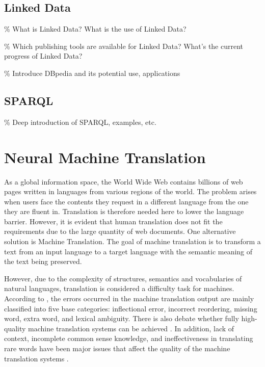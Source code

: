 \subsection{Linked Data} \label{subsection:linked data}
\% What is Linked Data? What is the use of Linked Data? 

\% Which publishing tools are available for Linked Data? What's the current progress of Linked Data?

\% Introduce DBpedia and its potential use, applications

\subsection{SPARQL} \label{subsection:sparql}
\% Deep introduction of SPARQL, examples, etc.


\section{Neural Machine Translation} \label{section:neural machine translation}
As a global information space, the World Wide Web contains billions of web pages written in languages from various regions of the world. The problem arises when users face the contents they request in a different language from the one they are fluent in. Translation is therefore needed here to lower the language barrier. However, it is evident that human translation does not fit the requirements due to the large quantity of web documents. One alternative solution is Machine Translation. The goal of machine translation is to transform a text from an input language to a target language with the semantic meaning of the text being preserved.

However, due to the complexity of structures, semantics and vocabularies of natural languages, translation is considered a difficulty task for machines. According to \cite{Popovic2012}, the errors occurred in the machine translation output are mainly classified into five base categories: inflectional error, incorrect reordering, missing word, extra word, and lexical ambiguity. There is also debate whether fully high-quality machine translation systems can be achieved \cite{bar1964language}. In addition, lack of context, incomplete common sense knowledge, and ineffectiveness in translating rare words have been major issues that affect the quality of the machine translation systems \cite{okpor2014machine} \cite{Wu2016}.

